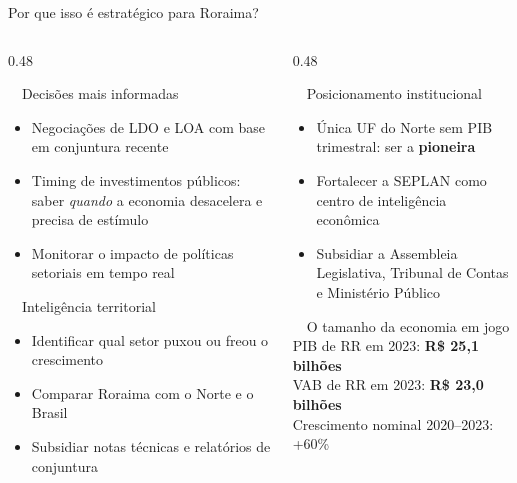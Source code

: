 \documentclass[aspectratio=169, 11pt]{beamer}
\begin{document}
\begin{frame}{Por que isso é estratégico para Roraima?}

  \begin{columns}[T]
    \begin{column}{0.48\textwidth}
      \begin{block}{\faChartLine\ \ Decisões mais informadas}
        \begin{itemize}
          \item Negociações de LDO e LOA com base em conjuntura recente
          \item Timing de investimentos públicos: saber \textit{quando} a
                economia desacelera e precisa de estímulo
          \item Monitorar o impacto de políticas setoriais em tempo real
        \end{itemize}
      \end{block}

      \vspace{0.2cm}

      \begin{block}{\faSearch\ \ Inteligência territorial}
        \begin{itemize}
          \item Identificar qual setor puxou ou freou o crescimento
          \item Comparar Roraima com o Norte e o Brasil
          \item Subsidiar notas técnicas e relatórios de conjuntura
        \end{itemize}
      \end{block}
    \end{column}

    \begin{column}{0.48\textwidth}
      \begin{block}{\faHandshake\ \ Posicionamento institucional}
        \begin{itemize}
          \item Única UF do Norte sem PIB trimestral: ser a \textbf{pioneira}
          \item Fortalecer a SEPLAN como centro de inteligência econômica
          \item Subsidiar a Assembleia Legislativa, Tribunal de Contas
                e Ministério Público
        \end{itemize}
      \end{block}

      \vspace{0.2cm}

      \begin{alertblock}{\faDollarSign\ \ O tamanho da economia em jogo}
        \centering
        PIB de RR em 2023: \textbf{R\$ 25,1 bilhões}\\
        VAB de RR em 2023: \textbf{R\$ 23,0 bilhões}\\
        {\small Crescimento nominal 2020--2023: +60\%}
      \end{alertblock}
    \end{column}
  \end{columns}

\end{frame}
\end{document}
